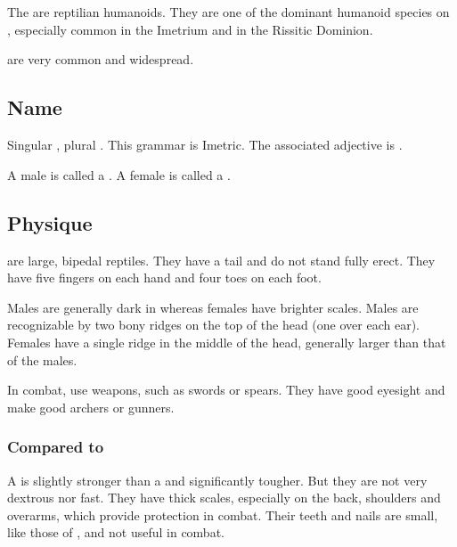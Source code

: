 \section[Scatha]{\Scatha}
The \scathae{} are reptilian humanoids. They are one of the dominant humanoid species on \Miith{}, especially common in the Imetrium and in the Rissitic Dominion. 

\Scathae{} are very common and widespread. %









\subsection{Name}
Singular \emph{\scatha{}}, plural \emph{\scathae{}}. 
This grammar is Imetric. 
The associated adjective is \emph{\scathaese{}}. 

A male \scatha{} is called a \dax. 
A female is called a \sphyle. 









\subsection{Physique}
\Scathae{} are large, bipedal reptiles. 
They have a tail and do not stand fully erect. 
They have five fingers on each hand and four toes on each foot. 

Males are generally dark in \colour whereas females have brighter scales. Males are recognizable by two bony ridges on the top of the head (one over each ear). Females have a single ridge in the middle of the head, generally larger than that of the males. 

In combat, \scathae{} use weapons, such as swords or spears. They have good eyesight and make good archers or gunners. 





\subsubsection{Compared to \humans}

A \scatha{} is slightly stronger than a \human and significantly tougher. 
But they are not very dextrous nor fast. 
They have thick scales, especially on the back, shoulders and overarms, which provide protection in combat. 
Their teeth and nails are small, like those of \humans, and not useful in combat. 

